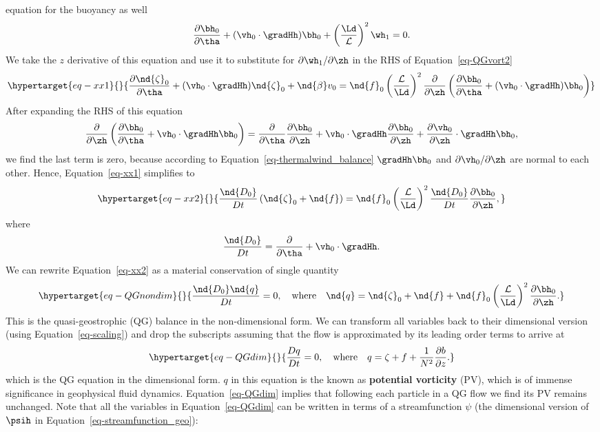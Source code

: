 \documentclass[
  letterpaper,
  twocolumn,
  landscape]{report}
\begin{document}
equation for the buoyancy as well \[
    \frac{\partial \bh_0}{\partial \tha} + (\vh_0 \cdot\gradHh ) \bh_0 + \left( \frac{\Ld}{\mathcal{L}} \right)^2 \wh_1 = 0.
\] We take the \(z\) derivative of this equation and use it to
substitute for \(\partial \wh_1 / \partial \zh\) in the RHS of
Equation~\ref{eq-QGvort2}
\begin{equation}\protect\hypertarget{eq-xx1}{}{
    \frac{\partial\nd{\zeta}_0}{\partial \tha} + (\vh_0 \cdot \gradHh ) \nd{\zeta}_0 + \nd{\beta} v_0 = \nd{f}_0 \left( \frac{\mathcal{L}}{\Ld}  \right)^2  \frac{\partial}{\partial \zh} \left( \frac{\partial \bh_0}{\partial \tha} +(\vh_0 \cdot\gradHh ) \bh_0 \right) 
}\label{eq-xx1}\end{equation} After expanding the RHS of this equation
\[  \frac{\partial}{\partial \zh} \left( \frac{\partial \bh_0}{\partial \tha} + \vh_0 \cdot\gradHh \bh_0 \right) = 
    \frac{\partial}{\partial \tha} \frac{\partial \bh_0}{\partial \zh} + \vh_0 \cdot\gradHh \frac{\partial \bh_0}{\partial \zh} +  \frac{\partial \vh_0}{\partial \zh} \cdot \gradHh \bh_0,
\] we find the last term is zero, because according to
Equation~\ref{eq-thermalwind_balance} \(\gradHh \bh_0\) and
\({\partial \vh_0}/{\partial \zh}\) are normal to each other. Hence,
Equation~\ref{eq-xx1} simplifies to
\begin{equation}\protect\hypertarget{eq-xx2}{}{
    \frac{\nd{D_0}}{D t} \left(\nd{\zeta}_0 + \nd{f}\right) = \nd{f}_0 \left( \frac{\mathcal{L}}{\Ld}  \right)^2  \frac{\nd{D_0}}{D t} \frac{\partial \bh_0}{\partial \zh},
}\label{eq-xx2}\end{equation} where \[
    \frac{\nd{D_0}}{D t} = \frac{\partial}{\partial \tha} + \vh_0 \cdot\gradHh. 
\] We can rewrite Equation~\ref{eq-xx2} as a material conservation of
single quantity \begin{equation}\protect\hypertarget{eq-QGnondim}{}{
    \frac{\nd{D_0} \nd{q}}{D t}  = 0, \quad \text{where} \quad \nd{q} = \nd{\zeta}_0 + \nd{f} +  \nd{f}_0 \left( \frac{\mathcal{L}}{\Ld}  \right)^2  \frac{\partial \bh_0}{\partial \zh}.
}\label{eq-QGnondim}\end{equation} This is the quasi-geostrophic (QG)
balance in the non-dimensional form. We can transform all variables back
to their dimensional version (using Equation~\ref{eq-scaling}) and drop
the subscripts assuming that the flow is approximated by its leading
order terms to arrive at
\begin{equation}\protect\hypertarget{eq-QGdim}{}{ 
    \frac{D q}{D t}  = 0, \quad \text{where} \quad q = \zeta + f +  \frac{1}{N^2}    \frac{\partial b}{\partial z}.
}\label{eq-QGdim}\end{equation} which is the QG equation in the
dimensional form. \(q\) in this equation is the known as
\textbf{potential vorticity} (PV), which is of immense significance in
geophysical fluid dynamics. Equation~\ref{eq-QGdim} implies that
following each particle in a QG flow we find its PV remains unchanged.
Note that all the variables in Equation~\ref{eq-QGdim} can be written in
terms of a streamfunction \(\psi\) (the dimensional version of \(\psih\)
in Equation~\ref{eq-streamfunction_geo}):
\end{document}
